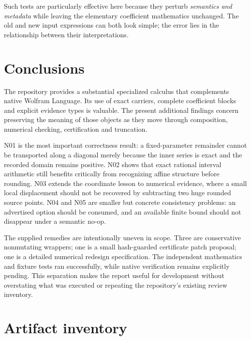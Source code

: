 \documentclass[11pt,a4paper]{article}
\begin{document}
Such tests are particularly effective here because they perturb \emph{semantics and metadata} while leaving the elementary coefficient mathematics unchanged. The old and new input expressions can both look simple; the error lies in the relationship between their interpretations.

\section{Conclusions}

The repository provides a substantial specialized calculus that complements native Wolfram Language. Its use of exact carriers, complete coefficient blocks and explicit evidence types is valuable. The present additional findings concern preserving the meaning of those objects as they move through composition, numerical checking, certification and truncation.

N01 is the most important correctness result: a fixed-parameter remainder cannot be transported along a diagonal merely because the inner series is exact and the recorded domain remains positive. N02 shows that exact rational interval arithmetic still benefits critically from recognizing affine structure before rounding. N03 extends the coordinate lesson to numerical evidence, where a small local displacement should not be recovered by subtracting two huge rounded source points. N04 and N05 are smaller but concrete consistency problems: an advertised option should be consumed, and an available finite bound should not disappear under a semantic no-op.

The supplied remedies are intentionally uneven in scope. Three are conservative nonmutating wrappers; one is a small hash-guarded certificate patch proposal; one is a detailed numerical redesign specification. The independent mathematics and fixture tests ran successfully, while native verification remains explicitly pending. This separation makes the report useful for development without overstating what was executed or repeating the repository's existing review inventory.

\appendix
\section{Artifact inventory}
\end{document}
